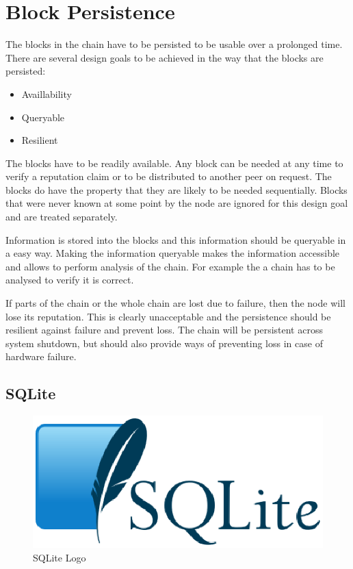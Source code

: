 \section{Block Persistence}
The blocks in the chain have to be persisted to be usable over a prolonged time.
There are several design goals to be achieved in the way that the blocks are persisted:
\begin{itemize}
    \item Availlability
    \item Queryable
    \item Resilient
\end{itemize}

The blocks have to be readily available.
Any block can be needed at any time to verify a reputation claim
or to be distributed to another peer on request.
The blocks do have the property that they are likely to be needed sequentially.
Blocks that were never known at some point by the node are ignored for this design goal
and are treated separately.

Information is stored into the blocks and this information should be queryable in a easy way.
Making the information queryable makes the information accessible
and allows to perform analysis of the chain.
For example the a chain has to be analysed to verify it is correct.

If parts of the chain or the whole chain are lost due to failure,
then the node will lose its reputation.
This is clearly unacceptable and the persistence should be resilient against failure
and prevent loss.
The chain will be persistent across system shutdown,
but should also provide ways of preventing loss in case of hardware failure.

\subsection{SQLite}
\begin{figure}
	\centerline{\includegraphics[scale=0.3]{design/figs/SQLite370.eps}}
	\caption{SQLite Logo}
	\label{fig:SQLite-logo}
\end{figure}

